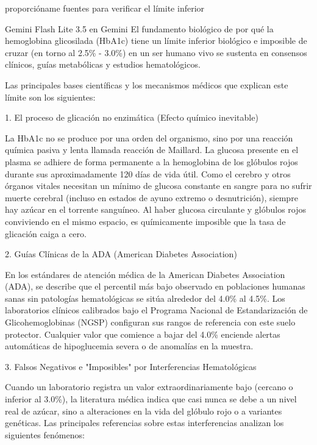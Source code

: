 \documentclass[12pt,a4paper,oneside]{book}
\begin{document}
\begin{iaprompt}
proporcióname fuentes para verificar el límite inferior
\end{iaprompt}
\begin{iaresp}{Gemini Flash Lite 3.5 en Gemini}
El fundamento biológico de por qué la hemoglobina glicosilada (HbA1c) tiene un límite inferior biológico e imposible de cruzar (en torno al 2.5\% - 3.0\%) en un ser humano vivo se sustenta en consensos clínicos, guías metabólicas y estudios hematológicos.

Las principales bases científicas y los mecanismos médicos que explican este límite son los siguientes:

1. El proceso de glicación no enzimática (Efecto químico inevitable)

La HbA1c no se produce por una orden del organismo, sino por una reacción química pasiva y lenta llamada reacción de Maillard. La glucosa presente en el plasma se adhiere de forma permanente a la hemoglobina de los glóbulos rojos durante sus aproximadamente 120 días de vida útil. Como el cerebro y otros órganos vitales necesitan un mínimo de glucosa constante en sangre para no sufrir muerte cerebral (incluso en estados de ayuno extremo o desnutrición), siempre hay azúcar en el torrente sanguíneo. Al haber glucosa circulante y glóbulos rojos conviviendo en el mismo espacio, es químicamente imposible que la tasa de glicación caiga a cero.

2. Guías Clínicas de la ADA (American Diabetes Association)

En los estándares de atención médica de la American Diabetes Association (ADA), se describe que el percentil más bajo observado en poblaciones humanas sanas sin patologías hematológicas se sitúa alrededor del 4.0\% al 4.5\%. Los laboratorios clínicos calibrados bajo el Programa Nacional de Estandarización de Glicohemoglobinas (NGSP) configuran sus rangos de referencia con este suelo protector. Cualquier valor que comience a bajar del 4.0\% enciende alertas automáticas de hipoglucemia severa o de anomalías en la muestra.

3. Falsos Negativos e "Imposibles" por Interferencias Hematológicas

Cuando un laboratorio registra un valor extraordinariamente bajo (cercano o inferior al 3.0\%), la literatura médica indica que casi nunca se debe a un nivel real de azúcar, sino a alteraciones en la vida del glóbulo rojo o a variantes genéticas. Las principales referencias sobre estas interferencias analizan los siguientes fenómenos:


\end{iaresp}
\end{document}
